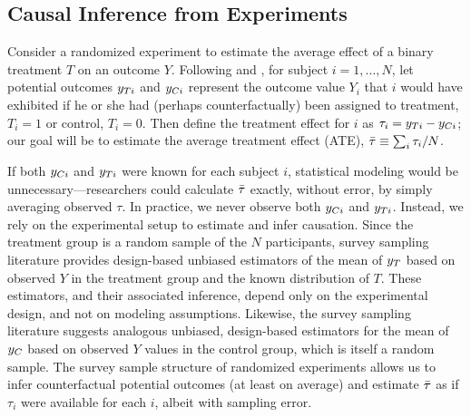 \subsection{Causal Inference from Experiments}
Consider a randomized experiment to estimate the average
effect of a binary treatment $T$ on an outcome $Y$.
Following \citet{neyman:1923} and \citet{rubin1974estimating}, for subject $i=1,\dots,N$,
let potential outcomes $y_{Ti}$ and $y_{Ci}$ represent the outcome value
$Y_i$ that $i$ would have exhibited if he or she had (perhaps
counterfactually) been assigned to treatment, $T_i=1$ or control,
$T_i=0$.
Then define the treatment effect for $i$ as $\tau_i=y_{Ti}-y_{Ci}$; our goal will be
to estimate the average treatment effect (ATE), $\bar{\tau}\equiv\sum_i\tau_i/N$.

If both $y_{Ci} $ and $y_{Ti} $ were known for each subject $i$,
statistical modeling would be unnecessary---researchers could
calculate $\bar{\tau} $ exactly, without error, %
by simply averaging observed $\tau$.
In practice, we never observe both $y_{Ci}$ and $y_{Ti}$.
Instead, we rely on the experimental setup to estimate and infer
causation.
Since the treatment group is a random sample of
the $N$ participants, survey sampling literature provides design-based
unbiased estimators of the mean of $y_T$ based on observed $Y$ in the treatment group
and the known distribution of $T$.
These estimators, and their associated inference, depend only on the
experimental design, and not on modeling assumptions.
Likewise, the survey sampling literature suggests analogous unbiased,
design-based estimators for the mean of $y_C$ based on observed $Y$ values in
the control group, which is itself a random sample.
The survey sample structure of randomized experiments allows us to
infer counterfactual potential outcomes (at least on average) and estimate $\bar{\tau}$ as if
$\tau_i$ were available for each $i$, albeit with sampling error.

